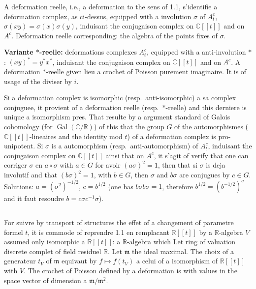 \documentclass[11pt,a4paper]{article}
\theoremstyle{plain}
\theoremstyle{definition}
\DeclareMathOperator{\Gal}{Gal}
\newcommand{\R}{\mathbb{R}}
\newcommand{\C}{\mathbb{C}}
\begin{document}
A deformation reelle, i.e., a deformation to the sens of 1.1, s'identifie a
deformation complex, as ci-dessus, equipped with a involution $\sigma$ of $A_{t}^{c}$, $\sigma(xy) = \sigma(x)\sigma(y)$, induisant the conjugaison complex on $\C[[t]]$ and on $A^{c}$. Deformation reelle
corresponding: the algebra of the points fixes of $\sigma$.

\textbf{Variante $*$-reelle:} deformations complexes $A_{t}^{c}$, equipped with a anti-involution $*$:
$(xy)^{*} = y^{*}x^{*}$, induisant the conjugaison complex on $\C[[t]]$ and on $A^{c}$. A deformation $*$-reelle given lieu a crochet of Poisson purement imaginaire. It is of usage
of the diviser by $i$.

Si a deformation complex is isomorphic (resp.\ anti-isomorphic) a sa complex conjuguee, it provient of a deformation reelle (resp.\ $*$-reelle) and this
derniere is unique a isomorphism pres. That resulte by a argument standard
of Galois cohomology (for $\Gal(\C/\R)$) of this that the group $G$ of the automorphismes ($\C[[t]]$-lineaires and the identity mod $t$) of a deformation complex is pro-unipotent. Si $\sigma$ is a automorphism (resp.\ anti-automorphism) of $A_{t}^{c}$, induisant
the conjugaison complex on $\C[[t]]$ ainsi that on $A^{c}$, it s'agit of verify that one can
corriger $\sigma$ en $a \circ \sigma$ with $a \in G$ for avoir $(a\sigma)^{2} = 1$, then that si $\sigma$ is deja involutif
and that $(b\sigma)^{2} = 1$, with $b \in G$, then $\sigma$ and $b\sigma$ are conjugues by $c \in G$. Solutions:
$a = (\sigma^{2})^{-1/2}$, $c = b^{1/2}$ (one has $b\sigma b\sigma = 1$, therefore $b^{1/2} = (b^{-1/2})^{\sigma}$ and it faut resoudre
$b = c \sigma c^{-1} \sigma$).

\subsection{}
For suivre by transport of structures the effet of a changement of parametre
formel $t$, it is commode of reprendre 1.1 en remplacant $\R[[t]]$ by a $\R$-algebra $V$
assumed only isomorphic a $\R[[t]]$: a $\R$-algebra which Let ring of valuation discrete complet of field residuel $\R$. Let $\mathfrak{m}$ the ideal maximal. The choix of a
generateur $t_{V}$ of $\mathfrak{m}$ equivaut by $f \mapsto f(t_{V})$ a celui of a isomorphism of $\R[[t]]$ with
$V$. The crochet of Poisson defined by a deformation is with values in the space
vector of dimension a $\mathfrak{m}/\mathfrak{m}^{2}$.
\end{document}
